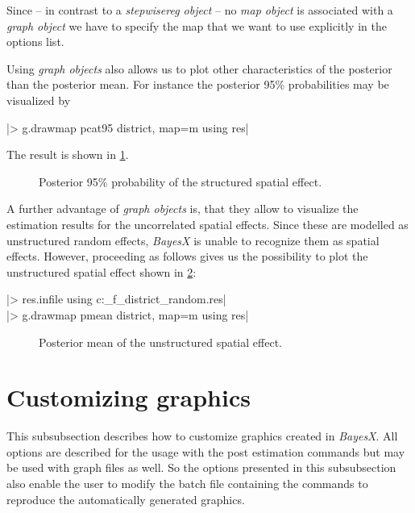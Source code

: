 Since -- in contrast to a {\it stepwisereg object} -- no {\it map object} is associated with a {\it graph object} we have to
specify the map that we want to use explicitly in the options list.

Using {\it graph objects} also allows us to plot other characteristics of the posterior than the posterior mean. For instance
the posterior 95\% probabilities may be visualized by

|> g.drawmap pcat95 district, map=m using res|

The result is shown in \ref{step:spat2}.

\begin{figure}[ht]
\begin{center}
{\it\caption{Posterior 95\% probability of the structured spatial
effect.\label{step:spat2}}}
\end{center}
\end{figure}

A further advantage of {\it graph objects} is, that they allow to visualize the estimation results for the uncorrelated spatial
effects. Since these are modelled as unstructured random effects, {\it BayesX} is unable to recognize them as spatial effects.
However, proceeding as follows gives us the possibility to plot the unstructured spatial effect shown in \ref{step:random1}:

|> res.infile using c:\data\s_f_district_random.res|\\
|> g.drawmap pmean district, map=m using res|

\begin{figure}[ht]
\begin{center}
{\it\caption{Posterior mean of the unstructured spatial
effect.\label{step:random1}}}
\end{center}
\end{figure}

\section{Customizing graphics}\label{step:custom}

This subsubsection describes how to customize graphics created in {\it BayesX}. All options are described for the usage with
the post estimation commands but may be used with graph files as well. So the options presented in this subsubsection also
enable the user to modify the batch file containing the commands to reproduce the automatically generated graphics.

